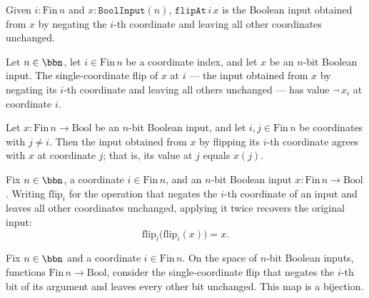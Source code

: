 \begin{definition}
\label{CommunicationComplexity.flipAt}
\leanok
{}
Given $i : \mathrm{Fin}\,n$ and $x : \texttt{BoolInput}(n)$, $\texttt{flipAt}\,i\,x$ is
the Boolean input obtained from $x$ by negating the $i$-th coordinate and leaving all
other coordinates unchanged.
\end{definition}

\begin{lemma}
\label{CommunicationComplexity.flipAt_apply_same}
\leanok
{}
Let $n \in \bbn$, let $i \in \mathrm{Fin}\,n$ be a coordinate index, and let $x$ be an
$n$-bit Boolean input. The single-coordinate flip of $x$ at $i$ — the input obtained
from $x$ by negating its $i$-th coordinate and leaving all others unchanged — has value
$\neg\,x_i$ at coordinate $i$.
\end{lemma}

\begin{lemma}
\label{CommunicationComplexity.flipAt_apply_ne}
\leanok
{}
Let $x \colon \mathrm{Fin}\,n \to \mathrm{Bool}$ be an $n$-bit Boolean input, and let
$i, j \in \mathrm{Fin}\,n$ be coordinates with $j \ne i$. Then the input obtained from
$x$ by flipping its $i$-th coordinate agrees with $x$ at coordinate $j$; that is, its
value at $j$ equals $x(j)$.
\end{lemma}

\begin{lemma}
\label{CommunicationComplexity.flipAt_flipAt}
\leanok
{}
Fix $n \in \bbn$, a coordinate $i \in \mathrm{Fin}\,n$, and an $n$-bit Boolean input $x
\colon \mathrm{Fin}\,n \to \mathrm{Bool}$. Writing $\mathrm{flip}_i$ for the operation
that negates the $i$-th coordinate of an input and leaves all other coordinates
unchanged, applying it twice recovers the original input:
\[
\mathrm{flip}_i\bigl(\mathrm{flip}_i(x)\bigr) = x.
\]
\end{lemma}

\begin{lemma}
\label{CommunicationComplexity.flipAt_bijective}
\leanok
{}
Fix $n \in \bbn$ and a coordinate $i \in \mathrm{Fin}\,n$. On the space of $n$-bit
Boolean inputs, functions $\mathrm{Fin}\,n \to \mathrm{Bool}$, consider the
single-coordinate flip that negates the $i$-th bit of its argument and leaves every
other bit unchanged. This map is a bijection.
\end{lemma}
